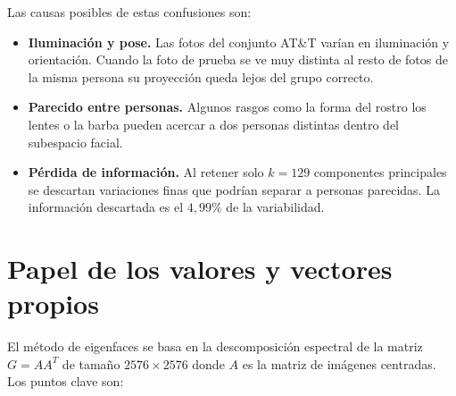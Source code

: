 \documentclass[12pt, letterpaper]{article}
\begin{document}
Las causas posibles de estas confusiones son:

\begin{itemize}
    \item \textbf{Iluminación y pose.} Las fotos del conjunto
    AT\&T varían en iluminación y orientación. Cuando la foto de
    prueba se ve muy distinta al resto de fotos de la misma
    persona su proyección queda lejos del grupo correcto.

    \item \textbf{Parecido entre personas.} Algunos rasgos como
    la forma del rostro los lentes o la barba pueden acercar a
    dos personas distintas dentro del subespacio facial.

    \item \textbf{Pérdida de información.} Al retener solo
    $k = 129$ componentes principales se descartan variaciones
    finas que podrían separar a personas parecidas. La
    información descartada es el $4{,}99\%$ de la variabilidad.
\end{itemize}

\section{Papel de los valores y vectores propios}

El método de eigenfaces se basa en la descomposición espectral
de la matriz $G = AA^{T}$ de tamaño $2576 \times 2576$ donde
$A$ es la matriz de imágenes centradas. Los puntos clave son:
\end{document}
